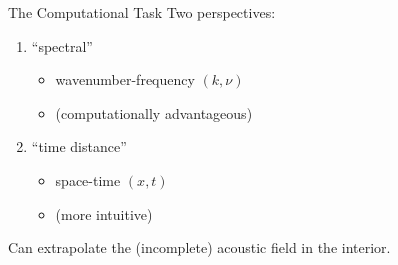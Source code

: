\documentclass{beamer}
\begin{document}
\begin{frame}{The Computational Task}
    Two perspectives:
    \begin{enumerate}
        \item ``spectral''
            \begin{itemize}
                \item wavenumber-frequency $(k,\nu)$
                \item (computationally advantageous)
            \end{itemize}
        \item ``time distance''
            \begin{itemize}
                \item space-time $(x,t)$
                \item (more intuitive)
            \end{itemize}
    \end{enumerate}
Can extrapolate the (incomplete) acoustic field in the interior.
\end{frame}

\end{document}
